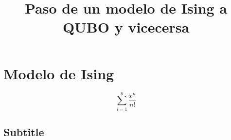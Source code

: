 \documentclass[11pt,a4paper]{article}
\begin{document}

\title{Paso de un modelo de Ising a QUBO y vicecersa}
\date{}
\maketitle

\thispagestyle{portada}

\section{Modelo de Ising}

\lipsum[1-3]
\newpage


\begin{equation}
    \sum_{i=1}^{n} \frac{x^n}{n!}
\end{equation}


\subsection*{Subtitle}
\lipsum[4-5]
\end{document}
